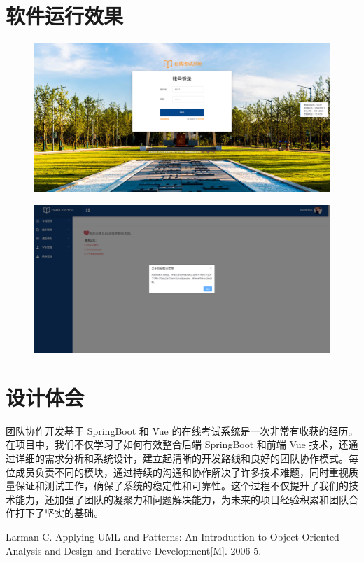 \documentclass{article}
\begin{document}
\section{软件运行效果}
\begin{figure}[H]
    \centering
    \includegraphics[width=0.8\linewidth]{效果A.bmp}
\end{figure}
\begin{figure}[H]
    \centering
    \includegraphics[width=0.8\linewidth]{效果B.bmp}
\end{figure}

\section{设计体会}
团队协作开发基于 SpringBoot 和 Vue 的在线考试系统是一次非常有收获的经历。在项目中，我们不仅学习了如何有效整合后端 SpringBoot 和前端 Vue 技术，还通过详细的需求分析和系统设计，建立起清晰的开发路线和良好的团队协作模式。每位成员负责不同的模块，通过持续的沟通和协作解决了许多技术难题，同时重视质量保证和测试工作，确保了系统的稳定性和可靠性。这个过程不仅提升了我们的技术能力，还加强了团队的凝聚力和问题解决能力，为未来的项目经验积累和团队合作打下了坚实的基础。

\begin{thebibliography}{99}
Larman C. Applying UML and Patterns: An Introduction to Object-Oriented Analysis and Design and Iterative Development[M]. 2006-5.
\end{thebibliography}
\end{document}
